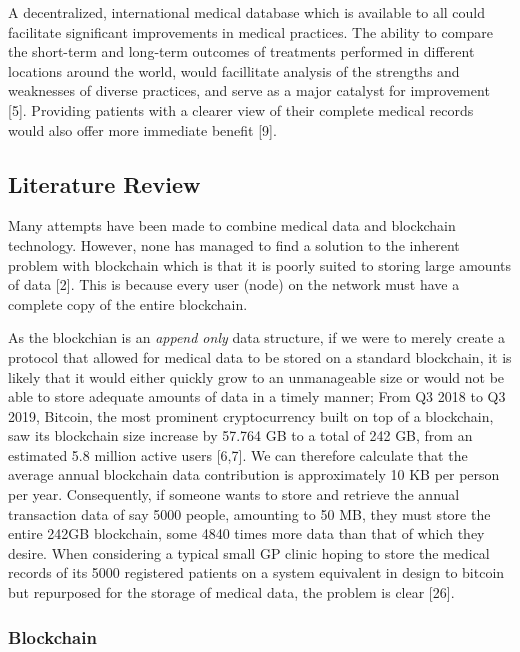 \documentclass[]{article}
\begin{document}
A decentralized, international medical database which is available to
all could facilitate significant improvements in medical practices. The
ability to compare the short-term and long-term outcomes of treatments
performed in different locations around the world, would facillitate
analysis of the strengths and weaknesses of diverse practices, and serve
as a major catalyst for improvement {[}5{]}. Providing patients with a
clearer view of their complete medical records would also offer more
immediate benefit {[}9{]}.

\hypertarget{header-n8}{%
\subsection{Literature Review}\label{header-n8}}

Many attempts have been made to combine medical data and blockchain
technology. However, none has managed to find a solution to the inherent
problem with blockchain which is that it is poorly suited to storing
large amounts of data {[}2{]}. This is because every user (node) on the
network must have a complete copy of the entire blockchain.

As the blockchian is an \emph{append only} data structure, if we were to
merely create a protocol that allowed for medical data to be stored on a
standard blockchain, it is likely that it would either quickly grow to
an unmanageable size or would not be able to store adequate amounts of
data in a timely manner; From Q3 2018 to Q3 2019, Bitcoin, the most
prominent cryptocurrency built on top of a blockchain, saw its
blockchain size increase by 57.764 GB to a total of 242 GB, from an
estimated 5.8 million active users {[}6,7{]}. We can therefore calculate
that the average annual blockchain data contribution is approximately 10
KB per person per year. Consequently, if someone wants to store and
retrieve the annual transaction data of say 5000 people, amounting to 50
MB, they must store the entire 242GB blockchain, some 4840 times more
data than that of which they desire. When considering a typical small GP
clinic hoping to store the medical records of its 5000 registered
patients on a system equivalent in design to bitcoin but repurposed for
the storage of medical data, the problem is clear {[}26{]}.

\hypertarget{header-n11}{%
\subsubsection{Blockchain}\label{header-n11}}
\end{document}
